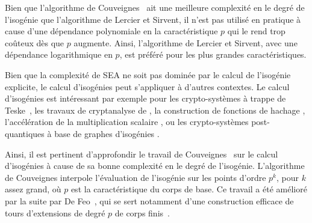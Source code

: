 \documentclass[10pt,a4paper]{book}
\theoremstyle{plain}
\theoremstyle{definition}
\theoremstyle{definition}
\theoremstyle{definition}
\theoremstyle{definition}
\theoremstyle{definition}
\theoremstyle{remark}
\theoremstyle{remark}
\theoremstyle{definition}
\begin{document}
Bien que l'algorithme de Couveignes~\cite{Couveignes96} ait une meilleure 
complexité en le degré de l'isogénie que l'algorithme de Lercier et 
Sirvent,%
il n'est pas utilisé en pratique à 
cause d'une dépendance polynomiale en la caractéristique $p$ qui le rend trop 
coûteux dès que $p$ augmente. Ainsi, l'algorithme de Lercier et 
Sirvent,%
 avec une dépendance logarithmique en $p$, 
est préféré pour les plus grandes caractéristiques. 

Bien que la complexité de SEA ne soit pas dominée par le calcul de l'isogénie 
explicite,
le calcul d'isogénies peut s'appliquer à d'autres
contextes. 
Le calcul d'isogénies est intéressant par exemple pour les crypto-systèmes à 
trappe de Teske~\cite{Teske06}, les travaux de cryptanalyse de 
 \cite{MaurerMenezesTeske01}, la construction de fonctions de hachage 
 \cite{CGL09}, l'accélération de la 
multiplication scalaire \cite{GallantLambertVanstone01,LongaSica14}, ou les 
crypto-systèmes post-quantiques à base de graphes d'isogénies 
\cite{Couveignes06} \cite{RostovtsevStolbunov06} \cite{DeFeoJaoPlut14}.



Ainsi, il est pertinent d'approfondir le travail de Couveignes~\cite{Couveignes96} 
sur le calcul d'isogénies à cause de sa bonne complexité en le degré
de l'isogénie.
L'algorithme de Couveignes interpole l'évaluation de l'isogénie sur les points 
d'ordre $p^k$, pour $k$ assez grand, où $p$ est la caractéristique du corps de 
base. Ce travail a été amélioré par la suite par De Feo~\cite{DeFeo11}, qui se 
sert notamment d'une construction efficace de tours d'extensions de degré $p$ 
de corps finis~\cite{Couveignes00,DeFeo-Shost'12}.
\end{document}
